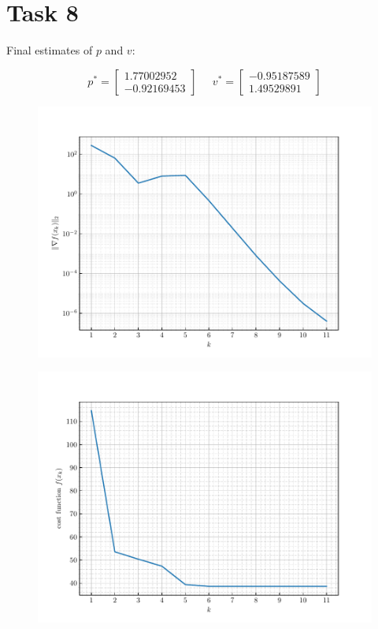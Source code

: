 \documentclass[12pt]{article}
\begin{document}
\section{Task 8}

Final estimates of $p$ and $v$:

\[
    p^{*} = \begin{bmatrix}1.77002952 \\ -0.92169453
            \end{bmatrix} \; \; \; \; \;
    v^{*} = \begin{bmatrix}-0.95187589 \\ 1.49529891
            \end{bmatrix} 
\]
\vspace{-1em}
\begin{figure}[H]
    \centering
    \includegraphics[scale = 0.9]{../../src/task_8/output/gradient_norms.pdf}
\end{figure}
\vspace{-3.3em}
\begin{figure}[H]
    \centering
    \includegraphics[scale = 0.9]{../../src/task_8/output/cost_function_values.pdf}
\end{figure}
\pagebreak
\end{document}
